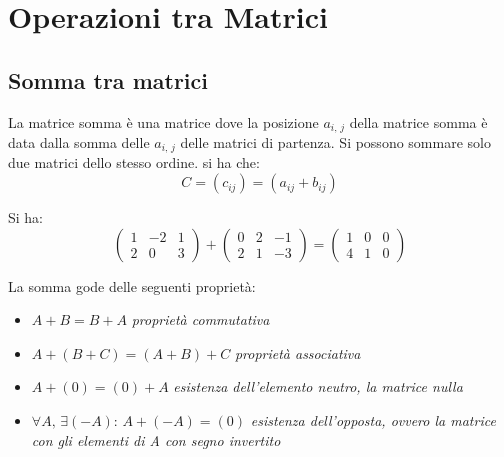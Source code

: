 \documentclass[a4paper,12pt, oneside]{book}
\begin{document}
\section{Operazioni tra Matrici}
\subsection{Somma tra matrici}
La matrice somma è una matrice dove la posizione $a_{i,\,j}$ della matrice somma è data dalla somma delle $a_{i,\,j}$ delle matrici di partenza. Si possono sommare solo due matrici dello stesso ordine. si ha che:
$$C=(c_{ij})=(a_{ij}+b_{ij})$$
\begin{esempio}
Si ha:\\
$$\left(\begin{matrix}
1 & -2 & 1\\
2 & 0 & 3
\end{matrix}\right)+\left(\begin{matrix}
0 & 2 & -1\\
2 & 1 & -3
\end{matrix}\right)=\left(\begin{matrix}
1 & 0 & 0\\
4 & 1 & 0
\end{matrix}\right)$$
\end{esempio}
La somma gode delle seguenti proprietà:
\begin{itemize}
\item $A+B=B+A$ \textit{proprietà commutativa}
\item $A+(B+C)=(A+B)+C$ \textit{proprietà associativa}
\item $A+(0)=(0)+A$ \textit{esistenza dell'elemento neutro, la matrice nulla}
\item $\forall A,\, \exists (-A):\, A+(-A)=(0)$ \textit{esistenza dell'opposta, ovvero la matrice con gli elementi di A con segno invertito}
\end{itemize}
\newpage
\end{document}
